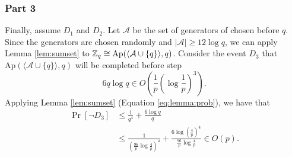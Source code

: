 \subsubsection*{Part 3}

\par Finally, assume $D_1$ and $D_2$. Let $\mathcal{A}$ be the set of generators of chosen before $q$. Since the generators are chosen randomly and $|\mathcal{A}| \geq 12\log q$, we can apply Lemma \ref{lem:sumset} to $\mathbb{Z}_q \cong \mathrm{Ap}(\langle\mathcal{A}\cup\{q\}\rangle, q)$. Consider the event $D_3$ that $\mathrm{Ap}(\langle\mathcal{A}\cup\{q\}\rangle, q)$ will be completed before step \[ 6q\log q \in O\left(\frac{1}{p}\left(\log \frac{1}{p}\right)^3\right).\] 
Applying Lemma \ref{lem:sumset} (Equation \ref{eq:lemma:prob}), we have that
\begin{align*}
\Pr[\lnot D_3] &\leq \frac{1}{q^4} + \frac{6\log q}{q} \\
&\leq \frac{1}{\left(\frac{96}{p}\log \frac{4}{p}\right)^4}
+ \frac{6\log\left(\frac{4}{p}\right)^4}{\frac{96}{p}\log\frac{4}{p}} \in O(p).
\end{align*}
\par 




